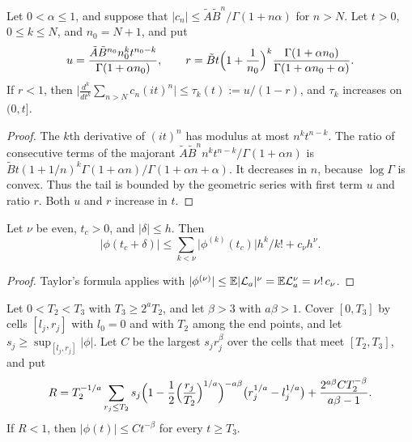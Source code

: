 \begin{lemma}[truncation]\label{lem:thr-trunc}
Let $0<\alpha\le1$, and suppose that
$\lvert c_n\rvert\le\tilde A\tilde B^n/\Gamma(1+n\alpha)$ for $n>N$. Let $t>0$,
$0\le k\le N$, and $n_0=N+1$, and put
\[
 u=\frac{\tilde A\tilde B^{n_0}n_0^kt^{n_0-k}}{\Gamma(1+\alpha n_0)},\qquad
 r=\tilde Bt\Bigl(1+\frac1{n_0}\Bigr)^k
 \frac{\Gamma(1+\alpha n_0)}{\Gamma(1+\alpha n_0+\alpha)} .
\]
If $r<1$, then
$\bigl\lvert\frac{d^k}{dt^k}\sum_{n>N}c_n(it)^n\bigr\rvert\le\tau_k(t):=u/(1-r)$,
and $\tau_k$ increases on $(0,t]$.
\end{lemma}

\begin{proof}
The $k$th derivative of $(it)^n$ has modulus at most $n^kt^{n-k}$. The ratio
of consecutive terms of the majorant
$\tilde A\tilde B^nn^kt^{n-k}/\Gamma(1+\alpha n)$ is
$\tilde Bt(1+1/n)^k\Gamma(1+\alpha n)/\Gamma(1+\alpha n+\alpha)$. It decreases
in $n$, because $\log\Gamma$ is convex. Thus the tail is bounded by the
geometric series with first term $u$ and ratio $r$. Both $u$ and $r$ increase
in $t$.
\end{proof}

\begin{lemma}\label{lem:thr-cells}
Let $\nu$ be even, $t_c>0$, and $\lvert\delta\rvert\le h$. Then
\[
 \lvert\phi(t_c+\delta)\rvert\le\sum_{k<\nu}\lvert\phi^{(k)}(t_c)\rvert
 h^k/k!+c_\nu h^\nu.
\]
\end{lemma}

\begin{proof}
Taylor's formula applies with
$\lvert\phi^{(\nu)}\rvert\le\mathbb{E}\lvert \mathcal L_a\rvert^\nu=\mathbb{E} \mathcal L_a^\nu=\nu!\,c_\nu$.
\end{proof}

\begin{lemma}\label{lem:thr-tail}
Let $0<T_2<T_3$ with $T_3\ge2^aT_2$, and let $\beta>3$ with $a\beta>1$.
Cover $[0,T_3]$ by cells $[l_j,r_j]$ with $l_0=0$ and with $T_2$ among the
end points, and let $s_j\ge\sup_{[l_j,r_j]}\lvert\phi\rvert$. Let $C$ be the
largest $s_jr_j^\beta$ over the cells that meet $[T_2,T_3]$, and put
\[
 R=T_2^{-1/a}\sum_{r_j\le T_2}s_j
 \Bigl(1-\frac12\Bigl(\frac{r_j}{T_2}\Bigr)^{1/a}\Bigr)^{-a\beta}
 \bigl(r_j^{1/a}-l_j^{1/a}\bigr)+\frac{2^{a\beta}CT_2^{-\beta}}{a\beta-1} .
\]
If $R<1$, then $\lvert\phi(t)\rvert\le Ct^{-\beta}$ for every $t\ge T_3$.
\end{lemma}

